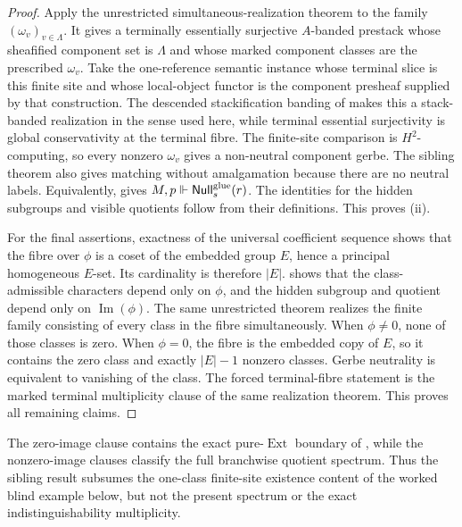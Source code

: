 \begin{proof}
Apply the unrestricted simultaneous-realization theorem
\cite[Theorem~6.1]{HomologicalVisibilityGluingObstructions2026} to the family
$(\omega_v)_{v\in\Lambda}$. It gives a terminally essentially surjective
$A$-banded prestack whose sheafified component set is $\Lambda$ and whose
marked component classes are the prescribed $\omega_v$. Take the
one-reference semantic instance whose terminal slice is this finite site and
whose local-object functor is the component presheaf supplied by that
construction. The descended
stackification banding of
 makes this a stack-banded realization
in the sense used here, while terminal essential surjectivity is global
conservativity at the terminal fibre. The finite-site comparison is
$H^2$-computing, so every nonzero $\omega_v$ gives a non-neutral component
gerbe. The sibling theorem also gives matching without amalgamation because
there are no neutral labels. Equivalently,
 gives
$M,p\Vdash\mathsf{Null}_s^{\mathrm{glue}}(r)$. The identities for the hidden
subgroups and visible quotients follow from their definitions. This proves
\textup{(ii)}.

For the final assertions, exactness of the universal coefficient sequence
shows that the fibre over $\phi$ is a coset of the embedded group $E$, hence a
principal homogeneous $E$-set. Its cardinality is therefore $|E|$.
 shows that the class-admissible
characters depend only on $\phi$, and the hidden subgroup and quotient depend
only on $\operatorname{Im}(\phi)$. The same unrestricted theorem realizes
the finite family consisting of every class in the fibre simultaneously.
When $\phi\ne0$, none of those classes is zero. When $\phi=0$, the fibre is
the embedded copy of $E$, so it contains the zero class and exactly $|E|-1$
nonzero classes. Gerbe neutrality is equivalent to vanishing of the class.
The forced terminal-fibre statement is the marked terminal multiplicity
clause of the same realization theorem. This proves all remaining claims.
\end{proof}

The zero-image clause contains the exact pure-$\operatorname{Ext}$ boundary
of \cite[Corollary~6.2]{HomologicalVisibilityGluingObstructions2026}, while
the nonzero-image clauses classify the full branchwise quotient spectrum.
Thus the sibling result subsumes the one-class finite-site existence content
of the worked blind example below, but not the present spectrum or the exact
indistinguishability multiplicity.
